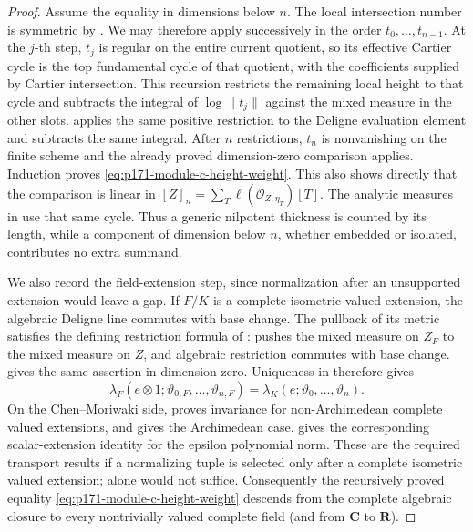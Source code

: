\begin{proof}
Assume the equality in dimensions below \(n\).  The local intersection
number is symmetric by
\cite[Remark~3.6.2(1)]{ChenMoriwaki21AdelicIntersection}.  We may therefore
apply
\cite[Definition~3.7.1 and formula~(3.16)]{ChenMoriwaki21AdelicIntersection}
successively in the order
\(t_0,\ldots,t_{n-1}\).  At the \(j\)-th step, \(t_j\) is regular on the
entire current quotient, so its effective Cartier cycle is the top
fundamental cycle of that quotient, with the coefficients supplied by
Cartier intersection.  This recursion restricts the remaining
local height to that cycle and subtracts the integral of
\(\log\lVert t_j\rVert\) against the mixed measure in the other slots.
\cite[Proposition~8.5 and Theorem~8.16, formula~(8.8)]{BE21} applies the
same positive restriction to the Deligne evaluation element and subtracts
the same integral.  After \(n\) restrictions, \(t_n\) is nonvanishing on the
finite scheme and the already proved dimension-zero comparison applies.
Induction proves \eqref{eq:p171-module-c-height-weight}.  This also shows
directly that the comparison is linear in
\([Z]_n=\sum_T\ell(\mathcal O_{Z,\eta_T})[T]\).  The analytic measures in
\cite[formula~(8.1) and Proposition~8.5]{BE21} use that same cycle.
Thus a generic nilpotent thickness is counted by its length, while a
component of dimension below \(n\), whether embedded or isolated,
contributes no extra summand.

We also record the field-extension step, since normalization after an
unsupported extension would leave a gap.  If \(F/K\) is a complete
isometric valued extension, the algebraic Deligne line commutes with base
change.  The pullback of its metric satisfies the defining restriction
formula of \cite[Theorem~8.16]{BE21}:
\cite[Proposition~8.3(iv)]{BE21} pushes the mixed measure on \(Z_F\) to the
mixed measure on \(Z\), and algebraic restriction commutes with base change.
\cite[Theorem~8.16, formula~(8.11)]{BE21} gives the same assertion in
dimension zero.  Uniqueness in \cite[Theorem~8.16]{BE21} therefore gives
\begin{equation}
 \lambda_F(e\otimes1;\vartheta_{0,F},\ldots,\vartheta_{n,F})
 =\lambda_K(e;\vartheta_0,\ldots,\vartheta_n).
 \label{eq:p171-module-c-deligne-base-change}
\end{equation}
On the Chen--Moriwaki side,
\cite[Proposition~3.8.9]{ChenMoriwaki21AdelicIntersection} proves invariance
for non-Archimedean complete valued extensions, and
\cite[Remark~3.8.10]{ChenMoriwaki21AdelicIntersection} gives the Archimedean
case.  \cite[Definition~3.8.2 and Remark~3.8.3]{ChenMoriwaki21AdelicIntersection}
gives the corresponding scalar-extension identity for the epsilon polynomial
norm.  These are the required transport results if a normalizing tuple is
selected only after a complete isometric valued extension;
\cite[Remark~1.6.8]{ChenMoriwaki21AdelicIntersection} alone would not
suffice.
Consequently the recursively proved equality
\eqref{eq:p171-module-c-height-weight} descends from the complete algebraic
closure to every nontrivially valued complete field (and from \(\mathbf C\)
to \(\mathbf R\)).


\end{proof}
